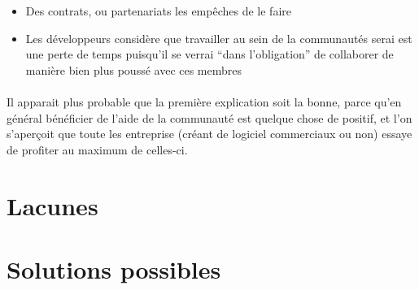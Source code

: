 \begin{itemize}

  \item {Des contrats, ou partenariats les empêches de le faire}

  \item {Les développeurs considère que travailler au sein de la
  communautés serai est
    une perte de temps puisqu'il se verrai ``dans l'obligation'' de
    collaborer de manière bien plus poussé avec ces membres}

\end{itemize}

\paragraph{}

Il apparait plus probable que la première explication soit la bonne, parce qu'en
général bénéficier de l'aide de la communauté est quelque chose de positif, et
l'on s'aperçoit que toute les entreprise (créant de logiciel commerciaux ou non)
essaye de profiter au maximum de celles-ci.

\subsubsection{}

\newpage \section{Lacunes} \newpage \section{Solutions possibles}

